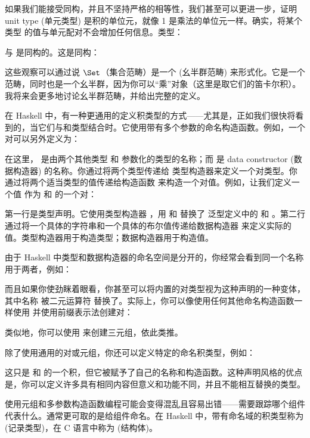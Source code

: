 如果我们能接受同构，并且不坚持严格的相等性，我们甚至可以更进一步，证明 unit type (单元类型) \code{()} 是积的单位元，就像 1 是乘法的单位元一样。确实，将某个类型  的值与单元配对不会增加任何信息。类型：

与  是同构的。这是同构：


这些观察可以通过说 $\Set$（集合范畴）是一个  (幺半群范畴) 来形式化。它是一个范畴，同时也是一个幺半群，因为你可以“乘”对象（这里是取它们的笛卡尔积）。我将来会更多地讨论幺半群范畴，并给出完整的定义。

在 Haskell 中，有一种更通用的定义积类型的方式——尤其是，正如我们很快将看到的，当它们与和类型结合时。它使用带有多个参数的命名构造函数。例如，一个对可以另外定义为：

在这里， 是由两个其他类型  和  参数化的类型的名称；而  是 data constructor (数据构造器) 的名称。你通过将两个类型传递给  类型构造器来定义一个对类型。你通过将两个适当类型的值传递给构造函数  来构造一个对值。例如，让我们定义一个值  作为  和  的一个对：

第一行是类型声明。它使用类型构造器 ，用  和  替换了  泛型定义中的  和 。第二行通过将一个具体的字符串和一个具体的布尔值传递给数据构造器  来定义实际的值。类型构造器用于构造类型；数据构造器用于构造值。

由于 Haskell 中类型和数据构造器的命名空间是分开的，你经常会看到同一个名称用于两者，例如：

而且如果你使劲眯着眼看，你甚至可以将内置的对类型视为这种声明的一种变体，其中名称  被二元运算符 \code{(,)} 替换了。实际上，你可以像使用任何其他命名构造函数一样使用 \code{(,)} 并使用前缀表示法创建对：

类似地，你可以使用 \code{(,,)} 来创建三元组，依此类推。

除了使用通用的对或元组，你还可以定义特定的命名积类型，例如：

这只是  和  的一个积，但它被赋予了自己的名称和构造函数。这种声明风格的优点是，你可以定义许多具有相同内容但意义和功能不同，并且不能相互替换的类型。

使用元组和多参数构造函数编程可能会变得混乱且容易出错——需要跟踪哪个组件代表什么。通常更可取的是给组件命名。在 Haskell 中，带有命名域的积类型称为  (记录类型)，在 C 语言中称为  (结构体)。

